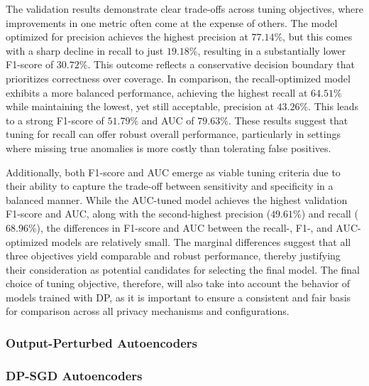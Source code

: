 The validation results demonstrate clear trade-offs across tuning objectives, where improvements in one metric often come at the expense of others. The model optimized for precision achieves the highest precision at $77.14\%$, but this comes with a sharp decline in recall to just $19.18\%$, resulting in a substantially lower F1-score of $30.72\%$. This outcome reflects a conservative decision boundary that prioritizes correctness over coverage. In comparison, the recall-optimized model exhibits a more balanced performance, achieving the highest recall at $64.51\%$ while maintaining the lowest, yet still acceptable, precision at $43.26\%$. This leads to a strong F1-score of $51.79\%$ and AUC of $79.63\%$. These results suggest that tuning for recall can offer robust overall performance, particularly in settings where missing true anomalies is more costly than tolerating false positives.

Additionally, both F1-score and AUC emerge as viable tuning criteria due to their ability to capture the trade-off between sensitivity and specificity in a balanced manner. While the AUC-tuned model achieves the highest validation F1-score and AUC, along with the second-highest precision ($49.61\%$) and recall ($68.96\%$), the differences in F1-score and AUC between the recall-, F1-, and AUC-optimized models are relatively small. The marginal differences suggest that all three objectives yield comparable and robust performance, thereby justifying their consideration as potential candidates for selecting the final model. The final choice of tuning objective, therefore, will also take into account the behavior of models trained with DP, as it is important to ensure a consistent and fair basis for comparison across all privacy mechanisms and configurations.

\subsubsection{Output-Perturbed Autoencoders}

\subsubsection{DP-SGD Autoencoders}



\iffalse\begin{itemize}
	\item State chosen $\varepsilon$ values; describe privacy-performance behavior.
	\item Refer to noise accounting files and tuning results.
	\item Optional: Highlight best $\varepsilon$ and headline test metric (e.g., recall improvement or precision drop).
\end{itemize}\fi

